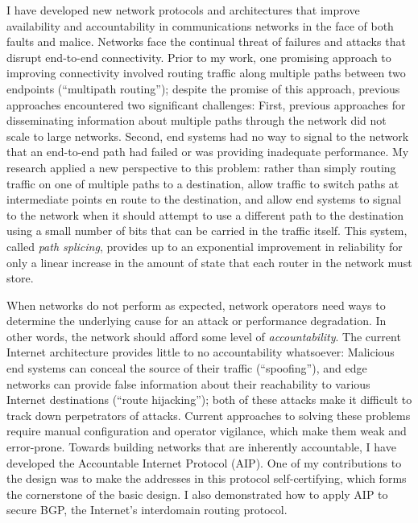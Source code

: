 I have developed new network protocols and architectures that improve
availability and accountability in communications networks in the face
of both faults and malice.  Networks face the continual threat of
failures and attacks that disrupt end-to-end connectivity.  Prior to my
work, one promising approach to improving connectivity involved routing
traffic along multiple paths between two endpoints (``multipath
routing''); despite the promise of this approach, previous approaches
encountered two significant challenges: First, previous approaches for
disseminating information about multiple paths through the network did
not scale to large networks.  Second, end systems had no way to signal
to the network that an end-to-end path had failed or was providing
inadequate performance.  My research applied a new perspective to this
problem: rather than simply routing traffic on one of multiple paths to
a destination, allow traffic to switch paths at intermediate points en
route to the destination, and allow end systems to signal to the network
when it should attempt to use a different path to the destination using
a small number of bits that can be carried in the traffic itself.  This
system, called {\em path splicing}, provides up to an exponential
improvement in reliability for only a linear increase in the amount of
state that each router in the network must store.

When networks do not perform as expected, network operators need ways to
determine the underlying cause for an attack or performance degradation.
In other words, the network should afford some level of {\em
accountability}.  The current Internet architecture provides little to
no accountability whatsoever: Malicious end systems can conceal the
source of their traffic (``spoofing''), and edge networks can provide
false information about their reachability to various Internet
destinations (``route hijacking''); both of these attacks make it
difficult to track down perpetrators of attacks.  Current approaches to
solving these problems require manual configuration and operator
vigilance, which make them weak and error-prone.  Towards building
networks that are inherently accountable, I have developed the
Accountable Internet Protocol (AIP).  One of my contributions to the
design was to make the addresses in this protocol self-certifying, which
forms the cornerstone of the basic design.  I also demonstrated how to
apply AIP to secure BGP, the Internet's interdomain routing protocol.


